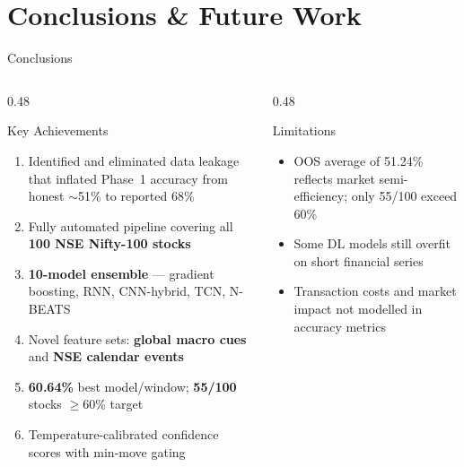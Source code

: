 \documentclass[aspectratio=43,11pt]{beamer}
\begin{document}
\section{Conclusions \& Future Work}

\begin{frame}[shrink=3]{Conclusions}
    \begin{columns}[T]
        \begin{column}{0.48\textwidth}
            \begin{exampleblock}{Key Achievements}
                \footnotesize\setlength{\itemsep}{3pt}
                \begin{enumerate}
                    \item Identified and eliminated data leakage that inflated Phase~1 accuracy from honest $\sim$51\% to reported 68\%
                    \item Fully automated pipeline covering all \textbf{100 NSE Nifty-100 stocks}
                    \item \textbf{10-model ensemble} --- gradient boosting, RNN, CNN-hybrid, TCN, N-BEATS
                    \item Novel feature sets: \textbf{global macro cues} and \textbf{NSE calendar events}
                    \item \textbf{60.64\%} best model/window; \textbf{55/100} stocks $\geq$60\% target
                    \item Temperature-calibrated confidence scores with min-move gating
                \end{enumerate}
            \end{exampleblock}
        \end{column}
        \begin{column}{0.48\textwidth}
            \begin{alertblock}{Limitations}
                \footnotesize\setlength{\itemsep}{2pt}
                \begin{itemize}
                    \item OOS average of 51.24\% reflects market semi-efficiency; only 55/100 exceed 60\%
                    \item Some DL models still overfit on short financial series
                    \item Transaction costs and market impact not modelled in accuracy metrics

\end{itemize}
\end{alertblock}
\end{column}
\end{columns}
\end{frame}
\end{document}

